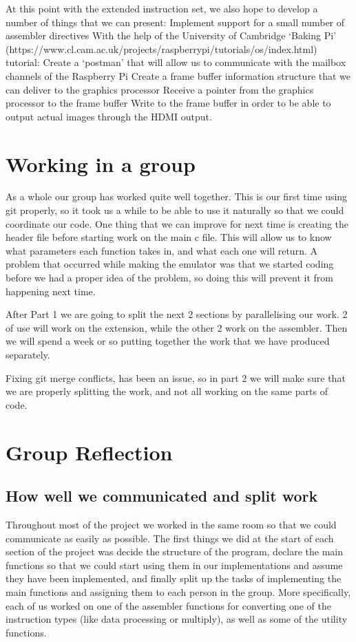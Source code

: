 \documentclass[a4paper]{article}
\begin{document}
At this point with the extended instruction set, we also hope to develop a number of things that we can present:
Implement support for a small number of assembler directives
With the help of the University of Cambridge ‘Baking Pi’ (https://www.cl.cam.ac.uk/projects/raspberrypi/tutorials/os/index.html) tutorial:
Create a ‘postman’ that will allow us to communicate with the mailbox channels of the Raspberry Pi
Create a frame buffer information structure that we can deliver to the graphics processor
Receive a pointer from the graphics processor to the frame buffer
Write to the frame buffer in order to be able to output actual images through the HDMI  output. 
\section{Working in a group}
As a whole our group has worked quite well together. This is our first time using git properly, so it took us a while to be able to use it naturally so that we could coordinate our code. One thing that we can improve for next time is creating the header file before starting work on the main c file. This will allow us to know what parameters each function takes in, and what each one will return. A problem that occurred while making the emulator was that we started coding before we had a proper idea of the problem, so doing this will prevent it from happening next time.

After Part 1 we are going to split the next 2 sections by parallelising our work. 2 of use will work on the extension, while the other 2 work on the assembler. Then we will spend a week or so putting together the work that we have produced separately.

Fixing git merge conflicts, has been an issue, so in part 2 we will make sure that we are properly splitting the work, and not all working on the same parts of code.

\section{Group Reflection}
\subsection{How well we communicated and split work}
Throughout most of the project we worked in the same room so that we could communicate as easily as possible. The first things we did at the start of each section of the project was decide the structure of the program, declare the main functions so that we could start using them in our implementations and assume they have been implemented, and finally split up the tasks of implementing the main functions and assigning them to each person in the group. More specifically, each of us worked on one of the assembler functions for converting one of the instruction types (like data processing or multiply), as well as some of the utility functions.
\end{document}
